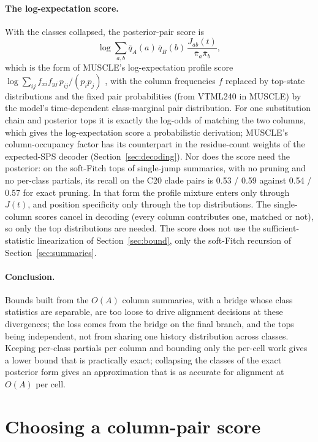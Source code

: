 \documentclass[11pt]{article}
\begin{document}
\paragraph{The log-expectation score.} With the classes collapsed, the
posterior-pair score is
\[
\log\sum_{a,b}\bar q_A(a)\,\bar q_B(b)\,\frac{J_{ab}(t)}{\bar\pi_a\bar\pi_b},
\]
which is the form of MUSCLE's log-expectation profile score
$\log\sum_{ij}f_{xi}f_{yj}\,p_{ij}/(p_ip_j)$ \citep{Edgar2004}, with the column
frequencies $f$ replaced by top-state distributions and the fixed pair
probabilities (from VTML240 in MUSCLE) by the model's time-dependent
class-marginal pair distribution. For one substitution chain and posterior tops
it is exactly the log-odds of matching the two columns, which gives the
log-expectation score a probabilistic derivation; MUSCLE's column-occupancy
factor has its counterpart in the residue-count weights of the expected-SPS
decoder (Section~\ref{sec:decoding}). Nor does the score need the posterior: on
the soft-Fitch tops of single-jump summaries, with no pruning and no per-class
partials, its recall on the C20 clade pairs is 0.53 / 0.59 against 0.54 / 0.57
for exact pruning. In that form the profile mixture enters only through $J(t)$,
and position specificity only through the top distributions. The single-column
scores cancel in decoding (every column contributes one, matched or not), so
only the top distributions are needed. The score does not use the
sufficient-statistic linearization of Section~\ref{sec:bound}, only the soft-Fitch
recursion of Section~\ref{sec:summaries}.

\paragraph{Conclusion.} Bounds built from the $O(A)$ column summaries, with a
bridge whose class statistics are separable, are too loose to drive alignment
decisions at these divergences; the loss comes from the bridge on the final
branch, and the tops being independent, not from sharing one history
distribution across classes. Keeping per-class partials per column and
bounding only the per-cell work gives a lower bound that is practically exact;
collapsing the classes of the exact posterior form gives an approximation that is
as accurate for alignment at $O(A)$ per cell.

\section{Choosing a column-pair score}
\label{sec:choose}
\end{document}

